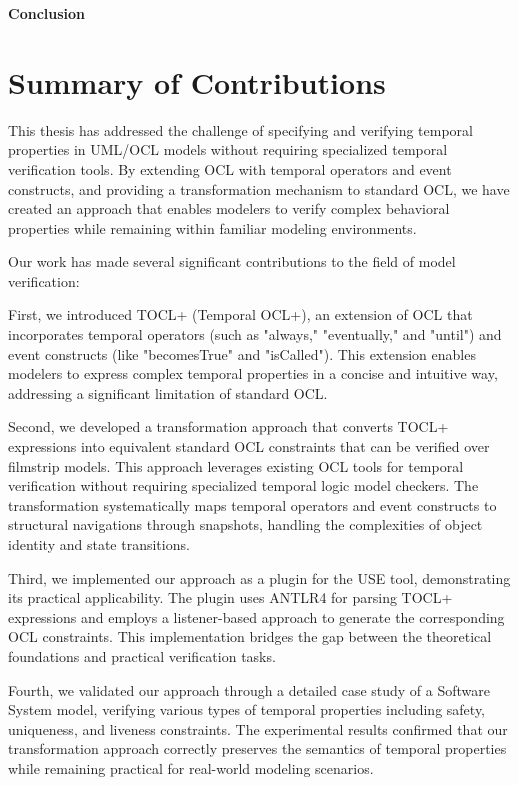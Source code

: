 \begin{center}
  \textbf{\fontsize{20}{24}\selectfont Conclusion}
\end{center}


\section*{Summary of Contributions}

This thesis has addressed the challenge of specifying and verifying temporal 
properties in UML/OCL models without requiring specialized temporal verification 
tools. By extending OCL with temporal operators and event constructs, and providing 
a transformation mechanism to standard OCL, we have created an approach that enables 
modelers to verify complex behavioral properties while remaining within familiar 
modeling environments.

Our work has made several significant contributions to the field of model verification:

First, we introduced TOCL+ (Temporal OCL+), an extension of OCL that incorporates 
temporal operators (such as "always," "eventually," and "until") and event constructs 
(like "becomesTrue" and "isCalled"). This extension enables modelers to express 
complex temporal properties in a concise and intuitive way, addressing a significant 
limitation of standard OCL.

Second, we developed a transformation approach that converts TOCL+ expressions into 
equivalent standard OCL constraints that can be verified over filmstrip models. This 
approach leverages existing OCL tools for temporal verification without requiring 
specialized temporal logic model checkers. The transformation systematically maps 
temporal operators and event constructs to structural navigations through snapshots, 
handling the complexities of object identity and state transitions.

Third, we implemented our approach as a plugin for the USE tool, demonstrating its 
practical applicability. The plugin uses ANTLR4 for parsing TOCL+ expressions and 
employs a listener-based approach to generate the corresponding OCL constraints. 
This implementation bridges the gap between the theoretical foundations and practical 
verification tasks.

Fourth, we validated our approach through a detailed case study of a Software System 
model, verifying various types of temporal properties including safety, uniqueness, 
and liveness constraints. The experimental results confirmed that our transformation 
approach correctly preserves the semantics of temporal properties while remaining 
practical for real-world modeling scenarios.

